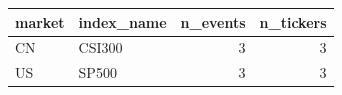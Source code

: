 \begin{tabular}{llrr}
\toprule
market & index_name & n_events & n_tickers \\
\midrule
CN & CSI300 & 3 & 3 \\
US & SP500 & 3 & 3 \\
\bottomrule
\end{tabular}
